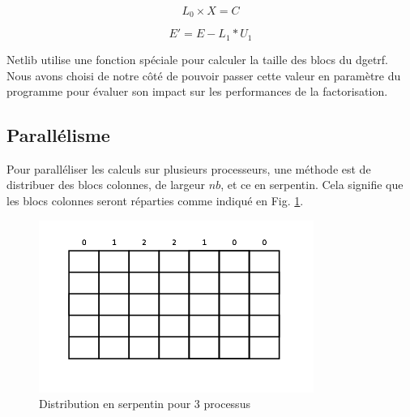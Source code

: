 \begin{equation}
\label{eq:dtrsm}
L_0 \times X = C
\end{equation}

\begin{equation}
\label{eq:dgemm}
E' = E - L_1 * U_1
\end{equation}

Netlib utilise une fonction spéciale pour calculer la taille des blocs du dgetrf. Nous avons choisi de notre côté de pouvoir passer cette valeur en paramètre du programme pour évaluer son impact sur les performances de la factorisation.

\subsection{Parallélisme} %
\label{sub:parallelisme}

Pour paralléliser les calculs sur plusieurs processeurs, une méthode est de distribuer des blocs colonnes, de largeur $nb$, et ce en serpentin. Cela signifie que les blocs colonnes seront réparties comme indiqué en Fig. \ref{fig:serpentin}.

\begin{figure}[H]
\centering
\includegraphics[width=0.8\textwidth]{serpentin}
\caption{Distribution en serpentin pour 3 processus}
\label{fig:serpentin}
\end{figure}


